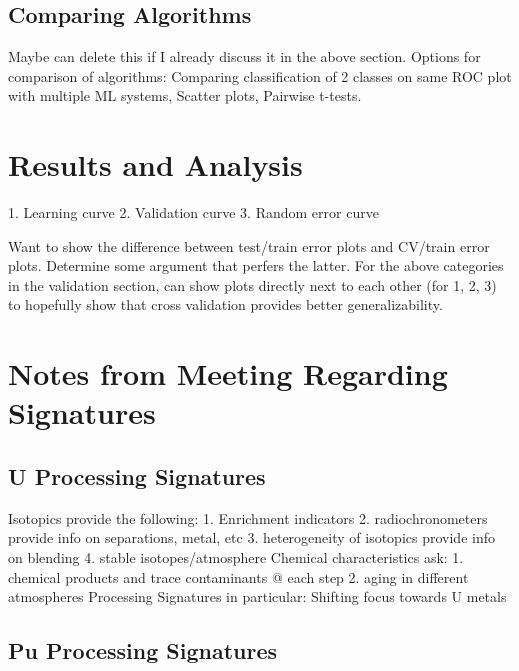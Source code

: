 \documentclass{anstrans}
\begin{document}


\subsection{Comparing Algorithms}

Maybe can delete this if I already discuss it in the above section. Options for
comparison of algorithms: Comparing classification of 2 classes on same ROC
plot with multiple ML systems, Scatter plots, Pairwise t-tests. 

\section{Results and Analysis}

1. Learning curve
2. Validation curve
3. Random error curve

Want to show the difference between test/train error plots and CV/train error
plots.  Determine some argument that perfers the latter. For the above
categories in the validation section, can show plots directly next to each
other (for 1, 2, 3) to hopefully show that cross validation provides better
generalizability.


\section{Notes from Meeting Regarding Signatures}
\subsection{U Processing Signatures}
Isotopics provide the following: 
1. Enrichment indicators
2. radiochronometers provide info on separations, metal, etc
3. heterogeneity of isotopics provide info on blending
4. stable isotopes/atmosphere 
Chemical characteristics ask: 
1. chemical products and trace contaminants @ each step
2. aging in different atmospheres
Processing Signatures in particular:
Shifting focus towards U metals


\subsection{Pu Processing Signatures}
\end{document}
